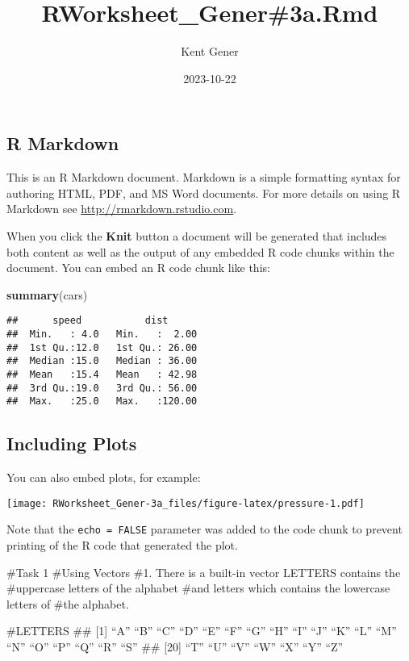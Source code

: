 \documentclass[
]{article}
\title{RWorksheet\_Gener\#3a.Rmd}
\author{Kent Gener}
\date{2023-10-22}
\newenvironment{Shaded}{\begin{snugshade}}{\end{snugshade}}
\newcommand{\FunctionTok}[1]{\textcolor[rgb]{0.13,0.29,0.53}{\textbf{#1}}}
\newcommand{\NormalTok}[1]{#1}
\begin{document}
\maketitle

\hypertarget{r-markdown}{%
\subsection{R Markdown}\label{r-markdown}}

This is an R Markdown document. Markdown is a simple formatting syntax
for authoring HTML, PDF, and MS Word documents. For more details on
using R Markdown see \url{http://rmarkdown.rstudio.com}.

When you click the \textbf{Knit} button a document will be generated
that includes both content as well as the output of any embedded R code
chunks within the document. You can embed an R code chunk like this:

\begin{Shaded}
\begin{Highlighting}[]
\FunctionTok{summary}\NormalTok{(cars)}
\end{Highlighting}
\end{Shaded}

\begin{verbatim}
##      speed           dist       
##  Min.   : 4.0   Min.   :  2.00  
##  1st Qu.:12.0   1st Qu.: 26.00  
##  Median :15.0   Median : 36.00  
##  Mean   :15.4   Mean   : 42.98  
##  3rd Qu.:19.0   3rd Qu.: 56.00  
##  Max.   :25.0   Max.   :120.00
\end{verbatim}

\hypertarget{including-plots}{%
\subsection{Including Plots}\label{including-plots}}

You can also embed plots, for example:

\texttt{[image: RWorksheet\_Gener-3a\_files/figure-latex/pressure-1.pdf]}

Note that the \texttt{echo\ =\ FALSE} parameter was added to the code
chunk to prevent printing of the R code that generated the plot.

\#Task 1 \#Using Vectors \#1. There is a built-in vector LETTERS
contains the \#uppercase letters of the alphabet \#and letters which
contains the lowercase letters of \#the alphabet.

\#LETTERS \#\# {[}1{]} ``A'' ``B'' ``C'' ``D'' ``E'' ``F'' ``G'' ``H''
``I'' ``J'' ``K'' ``L'' ``M'' ``N'' ``O'' ``P'' ``Q'' ``R'' ``S'' \#\#
{[}20{]} ``T'' ``U'' ``V'' ``W'' ``X'' ``Y'' ``Z''
\end{document}
